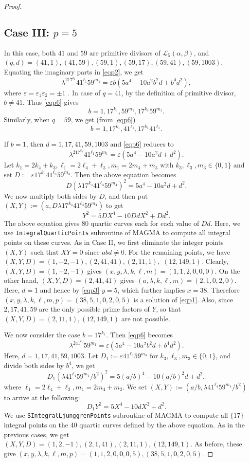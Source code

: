 \documentclass[10pt,a4paper]{amsart}
\begin{document}
\begin{proof}
\subsection*{Case III:  $p=5$} 
In this case, both $41$ and $59$ are primitive divisors of $\mathcal{L}_5(\alpha, \beta)$, and 
$(q, d)=(41, 1), (41, 59), (59, 1), (59, 17), (59, 41), (59, 1003)$. 
Equating the imaginary parts in \eqref{eqp2}, we get 
\begin{equation}\label{eqp6}
\lambda^217^{k_1}41^{\ell_1}59^{m_1}=\varepsilon b(5a^4-10a^2b^2d+b^4d^2),
\end{equation}
where $\varepsilon=\varepsilon_1\varepsilon_2=\pm 1$ . In case of $q=41$,  by the definition of primitive divisor, $b\ne 41$. Thus \eqref{eqp6} gives  
$$b=1,17^{k_1},59^{m_1}, 17^{k_1}59^{m_1}.$$
Similarly, when $q=59$,  we get (from \eqref{eqp6})
$$b=1,17^{k_1}, 41^{\ell_1}, 17^{k_1}41^{\ell_1}.$$

If $b=1$, then $d=1,17,41,59,1003$ and \eqref{eqp6} reduces to
$$\lambda^217^{k_1}41^{\ell_1}59^{m_1}=\varepsilon (5a^4-10a^2d+d^2).$$
Let $k_1=2k_4+k_3, \ell_1=2\ell_4+\ell_3, m_1=2m_4+m_3$ with $k_3,\ell_3, m_3\in\{0,1\}$ and set $D:=\varepsilon 17^{k_3}41^{\ell_3}59^{m_3}$. Then the above equation becomes 
$$D(\lambda 17^{k_4}41^{\ell_4}59^{m_4})^2=5a^4-10a^2d+d^2.$$
We now multiply both sides by $D$, and then put $(X, Y):=(a, D\lambda 17^{k_4}41^{\ell_4}59^{m_4})$ to get
$$Y^2=5DX^4-10DdX^2+Dd^2.$$
The above equation gives $80$ quartic curves each for each value of $Dd$. Here, we use \texttt{IntegralQuarticPoints} subroutine of MAGMA to compute all integral points on these curves. As in Case II, we first eliminate the integer points $(X,Y)$ such that $XY=0$ since $abd\ne0$. For the remaining points, we have $(X,Y, D)=(1,-2,-1), (2,41,41), (2,11,1),$ $ (12,149,1)$. Clearly, $(X,Y, D)=(1,-2,-1)$ gives $(x,y,\lambda,k,\ell,m)=(1,1,2,0,0,0)$. On the other hand, $(X,Y,D)=(2,41,41)$ gives $(a,\lambda, k,\ell, m)=(2,1,0,2,0)$. Here, $d=1$ and hence by \eqref{eqp3} $y=5$, which further implies $x=38$. Therefore $(x,y,\lambda, k, \ell, m, p)=(38,5,1,0,2,0,5)$ is a solution of \ref{eqp1}. Also, since $2,17,41,59$ are the only possible prime factors of $Y$, so that $(X,Y,D)=(2,11,1), (12,149,1)$ are not possible. 



We now consider the case $b=17^{k_1}$.  Then \eqref{eqp6} becomes 
$$\lambda^241^{\ell_1}59^{m_1}=\varepsilon (5a^4-10a^2b^2d+b^4d^2).$$
Here, $d=1,17,41,59,1003$.
Let $D_1:=\varepsilon 41^{\ell_3}59^{m_3}$ for $k_3, \ell_3, m_3\in\{0, 1\}$, and divide both sides by $b^4$, we get
$$D_1(\lambda 41^{\ell_4}59^{m_4}/b^2)^2=5(a/b)^4-10(a/b)^2d+d^2,$$
 where $ \ell_1=2\ell_4+\ell_3, m_1=2m_4+m_3$.
We set $(X, Y):=(a/b, \lambda 41^{\ell_4}59^{m_4}/b^2)$ to arrive at the following:
$$D_1Y^2=5X^4-10dX^2+d^2.$$
We use \texttt{SIntegralLjunggrenPoints} subroutine of MAGMA to compute all $\{17\}$-integral points on the $40$ quartic curves defined by the above equation. As in the previous cases, we get $(X,Y, D)=(1,2,-1), (2,1,41), (2,11,1), (12,149,1)$. 
As before, these give $(x,y,\lambda,k,\ell,m,p)=(1,1,2,0,0,0,5), (38,5,1,0,2,0,5)$.


\end{proof}
\end{document}
